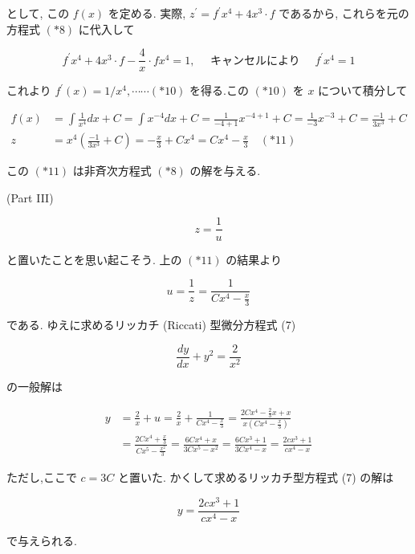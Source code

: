 \documentclass[10pt]{article}
\begin{document}
として, この $f(x)$ を定める. 実際, $z^{\prime}=f^{\prime} x^{4}+4 x^{3} \cdot f$ であるから, これらを元の方程式 $(* 8)$ に代入して

$$
f^{\prime} x^{4}+4 x^{3} \cdot f-\frac{4}{x} \cdot f x^{4}=1, \quad \text { キャンセルにより } \quad f^{\prime} x^{4}=1
$$

これより $f^{\prime}(x)=1 / x^{4}, \cdots \cdots(* 10)$ を得る.この $(* 10)$ を $x$ について積分して


\begin{align*}
f(x) & =\int \frac{1}{x^{4}} d x+C=\int x^{-4} d x+C=\frac{1}{-4+1} x^{-4+1}+C=\frac{1}{-3} x^{-3}+C=\frac{-1}{3 x^{3}}+C \\
z & =x^{4}\left(\frac{-1}{3 x^{3}}+C\right)=-\frac{x}{3}+C x^{4}=C x^{4}-\frac{x}{3} \quad(* 11) \tag{*11}
\end{align*}


この $(* 11)$ は非斉次方程式 $(* 8)$ の解を与える.

(Part III)


\begin{equation*}
z=\frac{1}{u} \tag{*7}
\end{equation*}


と置いたことを思い起こそう. 上の $(* 11)$ の結果より


\begin{equation*}
u=\frac{1}{z}=\frac{1}{C x^{4}-\frac{x}{3}} \tag{*12}
\end{equation*}


である. ゆえに求めるリッカチ (Riccati) 型微分方程式 (7)

$$
\frac{d y}{d x}+y^{2}=\frac{2}{x^{2}}
$$

の一般解は

$$
\begin{aligned}
y & =\frac{2}{x}+u=\frac{2}{x}+\frac{1}{C x^{4}-\frac{x}{3}}=\frac{2 C x^{4}-\frac{2}{3} x+x}{x\left(C x^{4}-\frac{x}{3}\right)} \\
& =\frac{2 C x^{4}+\frac{x}{3}}{C x^{5}-\frac{x^{2}}{3}}=\frac{6 C x^{4}+x}{3 C x^{5}-x^{2}}=\frac{6 C x^{3}+1}{3 C x^{4}-x}=\frac{2 c x^{3}+1}{c x^{4}-x}
\end{aligned}
$$

ただし,ここで $c=3 C$ と置いた. かくして求めるリッカチ型方程式 (7) の解は


\begin{equation*}
y=\frac{2 c x^{3}+1}{c x^{4}-x} \tag{*13}
\end{equation*}


で与えられる.
\end{document}
